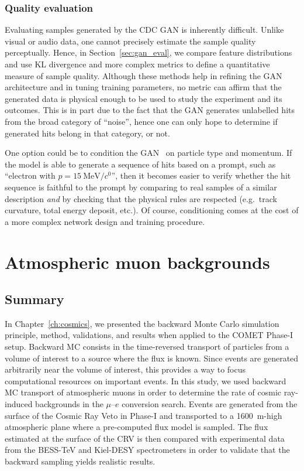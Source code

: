 \subsubsection{Quality evaluation}

Evaluating samples generated by the CDC GAN is inherently difficult. Unlike
visual or audio data, one cannot precisely estimate the sample quality
perceptually. Hence, in Section~\ref{sec:gan_eval}, we compare feature
distributions and use KL divergence and more complex metrics to define a
quantitative measure of sample quality. Although these methods help in refining
the GAN architecture and in tuning training parameters, no metric can affirm
that the generated data is physical enough to be used to study the experiment
and its outcomes. This is in part due to the fact that the GAN generates
unlabelled hits from the broad category of ``noise'', hence one can only hope to
determine if generated hits belong in that category, or not.

One option could be to condition the GAN~\cite{Mirza2014ConditionalGA} on
particle type and momentum. If the model is able to generate a sequence of hits
based on a prompt, such as ``electron with $p=\SI{15}{\MeV/\clight}$'', then it
becomes easier to verify whether the hit sequence is faithful to the prompt by
comparing to real samples of a similar description \emph{and} by checking that
the physical rules are respected (e.g.\ track curvature, total energy deposit,
etc.). Of course, conditioning comes at the cost of a more complex network
design and training procedure.



\section{Atmospheric muon backgrounds}

\subsection{Summary}
In Chapter~\ref{ch:cosmics}, we presented the backward Monte Carlo simulation
principle, method, validations, and results when applied to the COMET Phase\nobreakdash-I
setup. Backward MC consists in the time-reversed transport of particles from a
volume of interest to a source where the flux is known. Since events are
generated arbitrarily near the volume of interest, this provides a way to focus
computational resources on important events. In this study, we used backward MC
transport of atmospheric muons in order to determine the rate of cosmic
ray-induced backgrounds in the $\mu$--$e$ conversion search. Events are
generated from the surface of the Cosmic Ray Veto in Phase\nobreakdash-I and transported to
a \SI{1600}{\metre}-high atmospheric plane where a pre-computed flux model is
sampled. The flux estimated at the surface of the CRV is then compared with
experimental data from the BESS-TeV and Kiel-DESY spectrometers in order to
validate that the backward sampling yields realistic results. 

